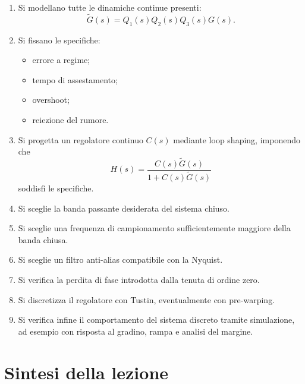 \begin{enumerate}
    \item Si modellano tutte le dinamiche continue presenti:
    \[
    \tilde G(s)=Q_1(s)Q_2(s)Q_3(s)G(s).
    \]

    \item Si fissano le specifiche:
    \begin{itemize}
        \item errore a regime;
        \item tempo di assestamento;
        \item overshoot;
        \item reiezione del rumore.
    \end{itemize}

    \item Si progetta un regolatore continuo \(C(s)\) mediante loop shaping,
    imponendo che
    \[
    H(s)=\frac{C(s)\tilde G(s)}{1+C(s)\tilde G(s)}
    \]
    soddisfi le specifiche.

    \item Si sceglie la banda passante desiderata del sistema chiuso.

    \item Si sceglie una frequenza di campionamento sufficientemente maggiore della banda chiusa.

    \item Si sceglie un filtro anti-alias compatibile con la Nyquist.

    \item Si verifica la perdita di fase introdotta dalla tenuta di ordine zero.

    \item Si discretizza il regolatore con Tustin, eventualmente con pre-warping.

    \item Si verifica infine il comportamento del sistema discreto tramite simulazione,
    ad esempio con risposta al gradino, rampa e analisi del margine.
\end{enumerate}

\section{Sintesi della lezione}


